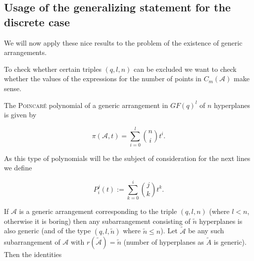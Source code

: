 \documentclass[a4paper]{article}
\begin{document}



\subsection{Usage of the generalizing statement for the discrete case}

We will now apply these nice results to the problem of the existence of generic arrangements.

To check whether certain triples $(q,l,n)$ can be excluded we want to check whether the values of the expressions for the number of points in $C_m(\mathcal{A})$ make sense.

The \textsc{Poincaré} polynomial of a generic arrangement in $GF(q)^l$ of $n$ hyperplanes is given by

\begin{equation}
  \pi(\mathcal{A},t)=\sum_{i=0}^l{\binom{n}{i}t^i}\text{.}
\end{equation}

As this type of polynomials will be the subject of consideration for the next lines we define

\begin{equation}
  P_i^j(t):=\sum_{k=0}^i{\binom{j}{k}t^k}\text{.}
\end{equation}

If $\mathcal{A}$ is a generic arrangement corresponding to the triple $(q,l,n)$ (where $l<n$, otherwise it is boring) then any subarrangement consisting of $\tilde{n}$ hyperplanes is also generic (and of the type $(q,l,\tilde{n})$ where $\tilde{n}\leq n$). Let $\tilde{\mathcal{A}}$ be any such subarrangement of $\mathcal{A}$ with $r(\tilde{\mathcal{A}})=\tilde{n}$ (number of hyperplanes as $\tilde{A}$ is generic). Then the identities
\end{document}
